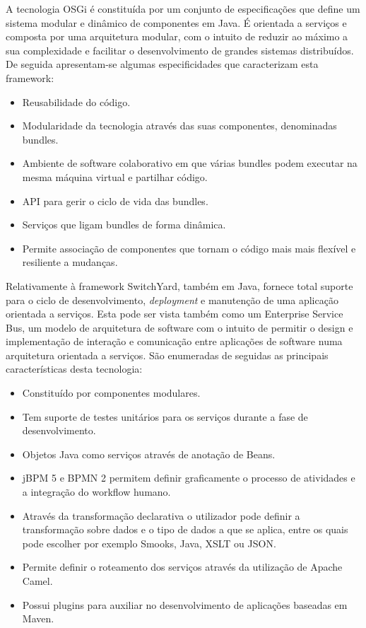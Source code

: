 A tecnologia OSGi é constituída por um conjunto de especificações que define um sistema modular e dinâmico de componentes em Java. É orientada a serviços e composta por uma arquitetura modular, com o intuito de reduzir ao máximo a sua complexidade e facilitar o desenvolvimento de grandes sistemas distribuídos. De seguida apresentam-se algumas especificidades que caracterizam esta framework:
\begin{itemize}
	\item Reusabilidade do código.
	\item Modularidade da tecnologia através das suas componentes, denominadas bundles.
	\item Ambiente de software colaborativo em que várias bundles podem executar na mesma máquina virtual e partilhar código.
	\item API para gerir o ciclo de vida das bundles.
	\item Serviços que ligam bundles de forma dinâmica.
	\item Permite associação de componentes que tornam o código mais mais flexível e resiliente a mudanças.
\end{itemize}

Relativamente à framework SwitchYard, também em Java, fornece total suporte para o ciclo de desenvolvimento, \textit{deployment} e manutenção de uma aplicação orientada a serviços. Esta pode ser vista também como um Enterprise Service Bus, um modelo de arquitetura de software com o intuito de permitir o design e implementação de interação e comunicação entre aplicações de software numa arquitetura orientada a serviços. São enumeradas de seguidas as principais características desta tecnologia:
\begin{itemize}
	\item Constituído por componentes modulares.
	\item Tem suporte de testes unitários para os serviços durante a fase de desenvolvimento.
	\item Objetos Java como serviços através de anotação de Beans.
	\item jBPM 5 e BPMN 2 permitem definir graficamente o processo de atividades e a integração do workflow humano.
	\item Através da transformação declarativa o utilizador pode definir a transformação sobre dados e o tipo de dados a que se aplica, entre os quais pode escolher por exemplo Smooks, Java, XSLT ou JSON.
	\item Permite definir o roteamento dos serviços através da utilização de Apache Camel.
	\item Possui plugins para auxiliar no desenvolvimento de aplicações baseadas em Maven. 
\end{itemize}

